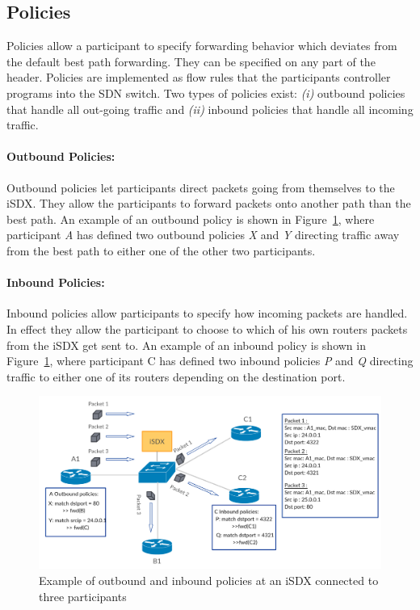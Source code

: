 \subsection{\label{chapter2:iSDX:policies}Policies}
Policies allow a participant to specify forwarding behavior which deviates from the default best path forwarding. They can be specified on any part of the header. Policies are implemented as flow rules that the participants controller programs into the SDN switch. Two types of policies exist: \emph{(i)} outbound policies that handle all out-going traffic and \emph{(ii)} inbound policies that handle all incoming traffic.

\paragraph{\label{chapter2:iSDX:policies:outbound policies}Outbound Policies:}
Outbound policies let participants direct packets going from themselves to the iSDX. They allow the participants to forward packets onto another path than the best path. An example of an outbound policy is shown in Figure~\ref{fig:isdx_policies}, where participant \emph{A} has defined two outbound policies \emph{X} and \emph{Y} directing traffic away from the best path to either one of the other two participants.

\paragraph{\label{chapter2:iSDX:policies:inbound policies}Inbound Policies:}
Inbound policies allow participants to specify how incoming packets are handled. In effect they allow the participant to choose to which of his own routers packets from the iSDX get sent to. An example of an inbound policy is shown in Figure~\ref{fig:isdx_policies}, where participant C has defined two inbound policies \emph{P} and \emph{Q} directing traffic to either one of its routers depending on the destination port. 

\begin{figure}[h]
\includegraphics[scale = 0.32]{Figures/bckgrnd_sdx_policies.pdf}
\caption{Example of outbound and inbound policies at an iSDX connected to three participants}
\label{fig:isdx_policies}
\end{figure}
  

